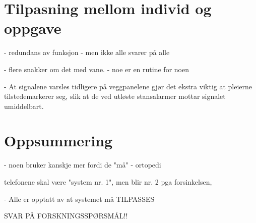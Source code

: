 \section{Tilpasning mellom individ og oppgave}


- redundans av funksjon
	- men ikke alle svarer på alle
	
- flere snakker om det med vane.
 - noe er en rutine for noen
 
- At signalene varsles tidligere på veggpanelene gjør det ekstra viktig at pleierne tilstedemarkerer seg, slik at de ved utløste stansalarmer mottar signalet umiddelbart. 


\section{Oppsummering}
- noen bruker kanskje mer fordi de "må" - ortopedi	

telefonene skal være "system nr. 1", men blir nr. 2 pga forsinkelsen,

- Alle er opptatt av at systemet må TILPASSES

SVAR PÅ FORSKNINGSSPØRSMÅL!!